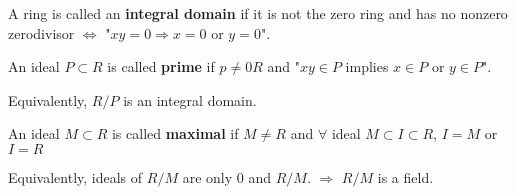 \begin{definition}
    A ring is called an  \textbf{integral domain} if it is not the zero ring and has no nonzero zerodivisor $ \Leftrightarrow $ "$ xy=0\Rightarrow x=0  $ or  $ y=0 $".\\
\end{definition}
\begin{definition}
    An ideal  $ P\subset R  $ is called \textbf{prime} if  $ p\not=0 R  $ and "$ xy\in P $ implies  $ x\in P  $ or  $ y\in P  $".
    
    Equivalently, $ R/P  $ is an integral domain.
\end{definition}
\begin{definition}
    An ideal  $ M\subset R  $ is called \textbf{maximal} if  $ M\not=R  $ and  $ \forall  $ ideal  $ M\subset I\subset R $, $ I=M  $ or  $ I=R  $  

    Equivalently, ideals of  $ R/M $ are only  $ 0  $ and  $ R/M $. $ \Rightarrow  $  $ R/M  $ is a field.
\end{definition}